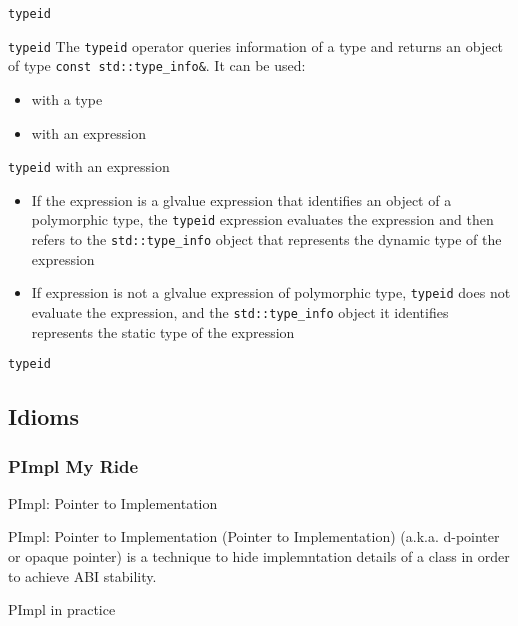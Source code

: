 \begin{frame}{\texttt{typeid}}{}
  \begin{block}{\texttt{typeid}}
    The \lstinline!typeid! operator queries information of a type and returns an object of type \lstinline!const std::type_info&!. It can be used:
    \begin{itemize}
    \item
      with a type
    \item
      with an expression
    \end{itemize}
  \end{block}

  \begin{block}{\texttt{typeid} with an expression}
    \begin{itemize}
    \item
      If the expression is a glvalue expression that identifies an object of a polymorphic type, the \lstinline!typeid! expression evaluates the expression and then refers to the \lstinline!std::type_info! object that represents the dynamic type of the expression
    \item
      If expression is not a glvalue expression of polymorphic type, \lstinline!typeid! does not evaluate the expression, and the \lstinline!std::type_info! object it identifies represents the static type of the expression
    \end{itemize}
  \end{block}
\end{frame}

\begin{frame}{\texttt{typeid}}{}
  \begin{example}
  \end{example}
\end{frame}

\subsection{Idioms}

\subsubsection{PImpl My Ride}

\begin{frame}{PImpl: Pointer to Implementation}{}
  \begin{block}{PImpl: Pointer to Implementation}
     (Pointer to Implementation) (a.k.a. d-pointer or opaque pointer) is a technique to hide implemntation details of a class in order to achieve ABI stability.
  \end{block}

  \begin{block}{PImpl in practice}
  \end{block}
\end{frame}

